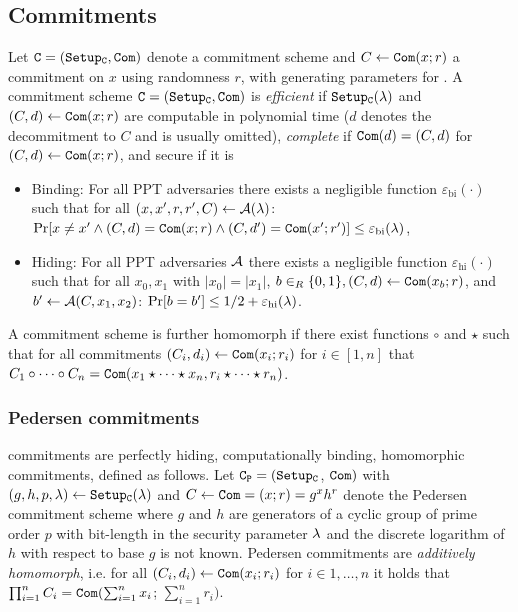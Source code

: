 \subsection{Commitments} \label{sec:commitments}
Let $\mathtt{C}=(\mathtt{Setup_C},\mathtt{Com})$ denote a commitment scheme and $C\gets\mathtt{Com}(x;r)$ a commitment on $x$ using randomness $r$, with \SetupC generating parameters for \Commitment.
A commitment scheme $\mathtt{C}=(\mathtt{Setup_C},\mathtt{Com})$ is \emph{efficient} if $\mathtt{Setup_C}(\lambda)$ and $(C,d)\gets\mathtt{Com}(x;r)$ are computable in polynomial time ($d$ denotes the decommitment to $C$ and is usually omitted), \emph{complete} if $\mathtt{Com}(d)=(C,d)$ for $(C,d)\gets\mathtt{Com}(x;r)$, and secure if it is
\begin{itemize}
  \item Binding: For all \ac{PPT} adversaries \cA there exists a negligible function $\varepsilon_{\mathrm{bi}}(\cdot)$ such that for all $(x,x',r,r',C)\gets \mathcal{A}(\lambda)$:
    $\Pr[x\not=x'\wedge (C,d)=\mathtt{Com}(x;r)\wedge (C,d')=\mathtt{Com}(x';r')] \leq \varepsilon_{\mathrm{bi}}(\lambda)$,
  \item Hiding: For all \ac{PPT} adversaries $\mathcal{A}$ there exists a negligible function $\varepsilon_{\mathrm{hi}}(\cdot)$ such that for all $x_0,x_1$ with $|x_0|=|x_1|$, $b\in_R\{0,1\}, (C,d)\gets\mathtt{Com}(x_b;r)$, and $b'\gets \mathcal{A}(C,x_1,x_2)$:
    $\Pr[b=b'] \leq 1/2+\varepsilon_{\mathrm{hi}}(\lambda)$.
\end{itemize}

\noindent
A commitment scheme is further homomorph if there exist functions $\circ$ and $\star$ such that for all commitments $(C_i,d_i)\gets\mathtt{Com}(x_i;r_i)$  for $i\in[1,n]$ that $C_1 \circ \cdots \circ C_n = \mathtt{Com}(x_1\star \cdots \star x_n, r_i\star \cdots \star r_n)$.

\subsubsection{Pedersen commitments}
\citet{Pedersen91} commitments are perfectly hiding, computationally binding, homomorphic commitments, defined as follows.
Let $\mathtt{C_P}=(\mathtt{Setup_C}$, $\mathtt{Com})$ with $(g,h,p,\lambda)\gets\mathtt{Setup_C}(\lambda)$ and $C\gets\mathtt{Com}=(x;r)=g^x h^r$ denote the Pedersen commitment scheme where $g$ and $h$ are generators of a cyclic group \GG of prime order $p$ with bit-length in the security parameter $\lambda$ and the discrete logarithm of $h$ with respect to base $g$ is not known.
Pedersen commitments are \emph{additively homomorph}, i.e. for all $(C_i,d_i) \gets \mathtt{Com}(x_i;r_i)$ for $i\in 1,\dots,n$ it holds that $\prod_{i=1}^{n}C_i=\mathtt{Com}(\sum_{i=1}^{n}x_i$; $\sum_{i=1}^{n}r_i)$.

